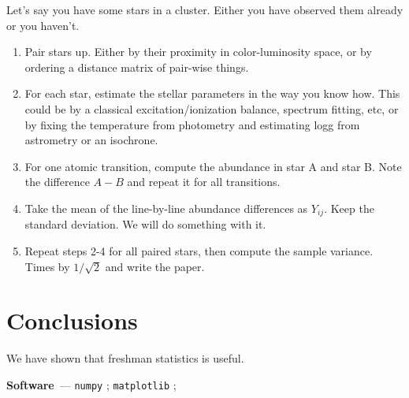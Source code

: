 \documentclass[modern]{aastex631}
\renewcommand{\paragraph}[1]{\medskip\par\noindent\textbf{#1}~---}
\begin{document}
Let's say you have some stars in a cluster. Either you have observed them already or you haven't.
\begin{enumerate}
    \item Pair stars up. Either by their proximity in color-luminosity space, or by ordering a distance matrix of pair-wise things.
    \item For each star, estimate the stellar parameters in the way you know how. This could be by a classical excitation/ionization balance, spectrum fitting, etc, or by fixing the temperature from photometry and estimating logg from astrometry or an isochrone.
    \item For one atomic transition, compute the abundance in star A and star B. Note the difference $A-B$ and repeat it for all transitions.
    \item Take the mean of the line-by-line abundance differences as $Y_{ij}$. Keep the standard deviation. We will do something with it.
    \item Repeat steps 2-4 for all paired stars, then compute the sample variance. Times by $1/\sqrt{2}$ and write the paper.
\end{enumerate}



\section{Conclusions} \label{sec:conclusions}
We have shown that freshman statistics is useful.

\paragraph{Software}
\texttt{numpy} \citep{numpy}; 
\texttt{matplotlib} \citep{matplotlib}; 



%
\end{document}
